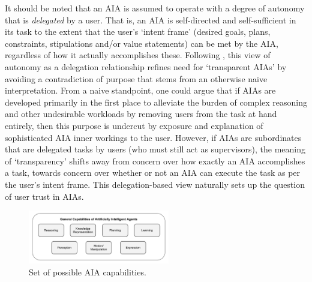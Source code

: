     It should be noted that an AIA is assumed to operate with a degree of autonomy that is \emph{delegated} by a user. That is, an AIA is self-directed and self-sufficient in its task to the extent that the user's `intent frame' (desired goals, plans, constraints, stipulations and/or value statements) can be met by the AIA, regardless of how it actually accomplishes these. %
    Following \citet{Miller2014-av}, this view of autonomy as a delegation relationship refines need for `transparent AIAs' by avoiding a contradiction of purpose that stems from an otherwise naive interpretation. From a naive standpoint, one could argue that if AIAs are developed primarily in the first place to alleviate the burden of complex reasoning and other undesirable workloads by removing users from the task at hand entirely, then this purpose is undercut by exposure and explanation of sophisticated AIA inner workings to the user. 
    However, if AIAs are subordinates that are delegated tasks by users (who must still act as supervisors), the meaning of `transparency' shifts away from concern over how exactly an AIA accomplishes a task, towards concern over whether or not an AIA can execute the task as per the user's intent frame. 
    This delegation-based view naturally sets up the question of user trust in AIAs. 

	\begin{figure}[t!]%
    	\centering
     	\includegraphics[width=0.55\textwidth]{Figures/AI_capabilities}
    	\caption{Set of possible AIA capabilities.}
        \label{fig:AIcapabilities}
    \end{figure}

